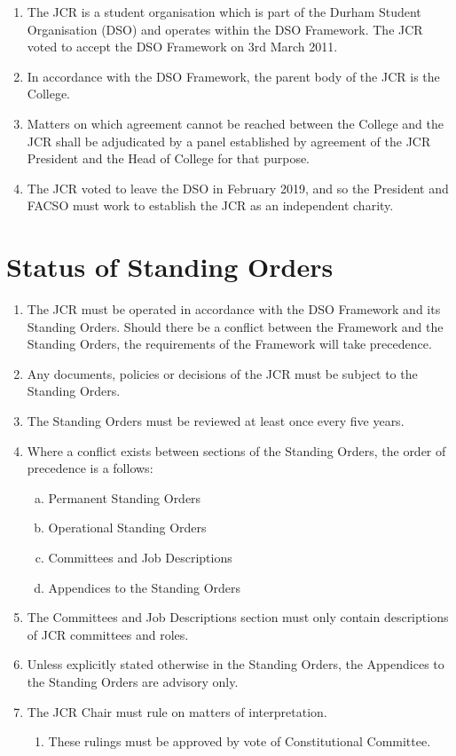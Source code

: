 \documentclass[12pt]{article}  %
\begin{document}
\begin{enumerate}
\begin{tabular}{|p{1.5in}|p{3.8in}|}
\end{tabular}
    \item The JCR is a student organisation which is part of the Durham Student Organisation (DSO) and operates within the DSO Framework. The JCR voted to accept the DSO Framework on 3rd March 2011.
    \item In accordance with the DSO Framework, the parent body of the JCR is the College.
    \item Matters on which agreement cannot be reached between the College and the JCR shall be adjudicated by a panel established by agreement of the JCR President and the Head of College for that purpose.
    \item The JCR voted to leave the DSO in February 2019, and so the President and FACSO must work to establish the JCR as an independent charity.
\end{enumerate}

\section{Status of Standing Orders}
\begin{enumerate}
    \item The JCR must be operated in accordance with the DSO Framework and its Standing Orders. Should there be a conflict between the Framework and the Standing Orders, the requirements of the Framework will take precedence.
    \item Any documents, policies or decisions of the JCR must be subject to the Standing Orders.
    \item The Standing Orders must be reviewed at least once every five years.
    \item Where a conflict exists between sections of the Standing Orders, the order of precedence is a follows:
    \begin{enumerate}[a)]
        \item Permanent Standing Orders
        \item Operational Standing Orders
        \item Committees and Job Descriptions
        \item Appendices to the Standing Orders
    \end{enumerate}
    \item The Committees and Job Descriptions section must only contain descriptions of JCR committees and roles.
    \item Unless explicitly stated otherwise in the Standing Orders, the Appendices to the Standing Orders are advisory only.
    \item The JCR Chair must rule on matters of interpretation.
    \begin{enumerate}
        \item These rulings must be approved by vote of Constitutional Committee.
    \end{enumerate}
\end{enumerate}
\newpage
\end{document}
